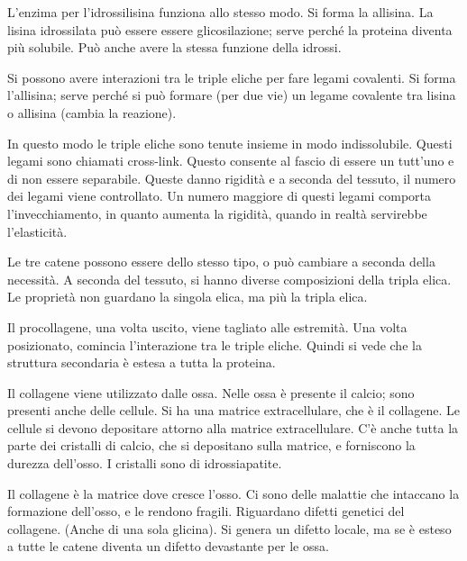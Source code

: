 L'enzima per l'idrossilisina funziona allo stesso modo. Si forma la
allisina. La lisina idrossilata può essere essere
glicosilazione; serve perché la proteina diventa più solubile. Può anche
avere la stessa funzione della idrossi.

\vfill
\pagebreak


Si possono avere interazioni tra le triple eliche per fare legami
covalenti.
Si forma l'allisina; serve perché si può formare (per due
vie) un legame covalente tra lisina o allisina (cambia la reazione).

In questo modo le triple eliche sono tenute insieme in modo
indissolubile. Questi legami sono chiamati cross-link.
Questo consente al fascio di essere un tutt'uno e di non essere
separabile.
Queste danno rigidità e a seconda del tessuto, il numero dei legami
viene controllato.
Un numero maggiore di questi legami comporta l'invecchiamento, in quanto
aumenta la rigidità, quando in realtà servirebbe l'elasticità.

Le tre catene possono essere dello stesso tipo, o può cambiare a seconda
della necessità. A seconda del tessuto, si hanno diverse composizioni
della tripla elica.
Le proprietà non guardano la singola elica, ma più la tripla elica.

Il procollagene, una volta uscito, viene tagliato alle estremità. Una
volta posizionato, comincia l'interazione tra le triple eliche.
Quindi si vede che la struttura secondaria è estesa a tutta la proteina.


Il collagene viene utilizzato dalle ossa. Nelle ossa è presente il
calcio; sono presenti anche delle cellule.
Si ha una matrice extracellulare, che è il collagene. Le cellule si
devono depositare attorno alla matrice extracellulare.
C'è anche tutta la parte dei cristalli di calcio, che si depositano
sulla matrice, e forniscono la durezza dell'osso. I cristalli sono di
idrossiapatite.

Il collagene è la matrice dove cresce l'osso. Ci sono delle malattie che
intaccano la formazione dell'osso, e le rendono fragili. Riguardano
difetti genetici del collagene. (Anche di una sola glicina).
Si genera un difetto locale, ma se è esteso a tutte le catene diventa un
difetto devastante per le ossa.

\clearpage



